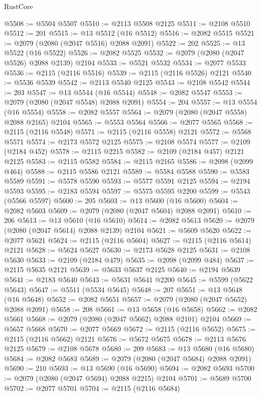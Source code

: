 \begin{lexlean}{RustCore}
\begin{coremodule}
@5508 := @5504 @5507
@5510 := @2113 @5508 @2125
@5511 := @2108 @5510
@5512 := 201
@5515 := @13 @5512 (@16 @5512)
@5516 := @2082 @5515
@5521 := @2079 (@2080 (@2047 @5516) @2088 @2091)
@5522 := 202
@5525 := @13 @5522 (@16 @5522)
@5526 := @2082 @5525
@5532 := @2079 (@2080 (@2047 @5526) @2088 @2139) @2104
@5533 := @5521 @5532
@5534 := @2077 @5533
@5536 := @2115 (@2116 @5516)
@5539 := @2115 (@2116 @5526) @2121
@5540 := @5536 @5539
@5542 := @2113 @5540 @2125
@5543 := @2108 @5542
@5544 := 203
@5547 := @13 @5544 (@16 @5544)
@5548 := @2082 @5547
@5553 := @2079 (@2080 (@2047 @5548) @2088 @2091)
@5554 := 204
@5557 := @13 @5554 (@16 @5554)
@5558 := @2082 @5557
@5564 := @2079 (@2080 (@2047 @5558) @2088 @2165) @2104
@5565 := @5553 @5564
@5566 := @2077 @5565
@5568 := @2115 (@2116 @5548)
@5571 := @2115 (@2116 @5558) @2121
@5572 := @5568 @5571
@5574 := @2173 @5572 @2125
@5575 := @2108 @5574
@5577 := @2109 (@2184 @452)
@5578 := @2115 @2215
@5582 := @2109 (@2184 @457) @2121 @2125
@5583 := @2115 @5582
@5584 := @2115 @2165
@5586 := @2098 (@2099 @464)
@5588 := @2115 @5586 @2121
@5589 := @5584 @5588
@5590 := @5583 @5589
@5591 := @5578 @5590
@5593 := @5577 @5591 @2125
@5594 := @2194 @5593
@5595 := @2183 @5594
@5597 := @5575 @5595 @2200
@5599 := @5543 (@5566 @5597)
@5600 := 205
@5603 := @13 @5600 (@16 @5600)
@5604 := @2082 @5603
@5609 := @2079 (@2080 (@2047 @5604) @2088 @2091)
@5610 := 206
@5613 := @13 @5610 (@16 @5610)
@5614 := @2082 @5613
@5620 := @2079 (@2080 (@2047 @5614) @2088 @2139) @2104
@5621 := @5609 @5620
@5622 := @2077 @5621
@5624 := @2115 (@2116 @5604)
@5627 := @2115 (@2116 @5614) @2121
@5628 := @5624 @5627
@5630 := @2173 @5628 @2125
@5631 := @2108 @5630
@5633 := @2109 (@2184 @479)
@5635 := @2098 (@2099 @484)
@5637 := @2115 @5635 @2121
@5639 := @5633 @5637 @2125
@5640 := @2194 @5639
@5641 := @2183 @5640
@5643 := @5631 @5641 @2200
@5645 := @5599 (@5622 @5643)
@5647 := @5511 (@5534 @5645)
@5648 := 207
@5651 := @13 @5648 (@16 @5648)
@5652 := @2082 @5651
@5657 := @2079 (@2080 (@2047 @5652) @2088 @2091)
@5658 := 208
@5661 := @13 @5658 (@16 @5658)
@5662 := @2082 @5661
@5668 := @2079 (@2080 (@2047 @5662) @2088 @2101) @2104
@5669 := @5657 @5668
@5670 := @2077 @5669
@5672 := @2115 (@2116 @5652)
@5675 := @2115 (@2116 @5662) @2121
@5676 := @5672 @5675
@5678 := @2113 @5676 @2125
@5679 := @2108 @5678
@5680 := 209
@5683 := @13 @5680 (@16 @5680)
@5684 := @2082 @5683
@5689 := @2079 (@2080 (@2047 @5684) @2088 @2091)
@5690 := 210
@5693 := @13 @5690 (@16 @5690)
@5694 := @2082 @5693
@5700 := @2079 (@2080 (@2047 @5694) @2088 @2215) @2104
@5701 := @5689 @5700
@5702 := @2077 @5701
@5704 := @2115 (@2116 @5684)

\end{coremodule}
\end{lexlean}

